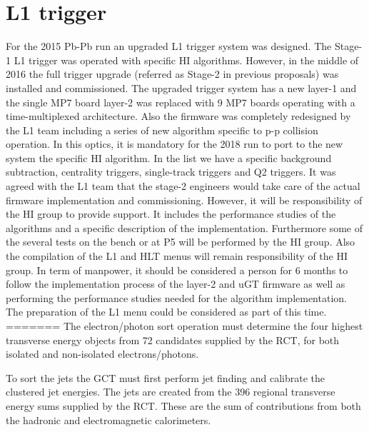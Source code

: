 \section{L1 trigger\label{sec:L1Trigger}}
For the 2015 Pb-Pb run an upgraded L1 trigger system was designed. The Stage-1 L1 trigger was operated with specific HI
algorithms. However, in the middle of 2016 the full trigger upgrade (referred as Stage-2 in previous proposals) was
installed and commissioned. The upgraded trigger system has a new layer-1 and the single MP7 board layer-2 was replaced
with 9 MP7 boards operating with a time-multiplexed architecture. Also the firmware was completely redesigned by the L1
team including a series of new algorithm specific to p-p collision operation. In this optics, it is mandatory for the
2018 run to port to the new system the specific HI algorithm. In the list we have a specific background subtraction,
centrality triggers, single-track triggers and Q2 triggers. It was agreed with the L1 team that the stage-2 engineers
would take care of the actual firmware implementation and commissioning. However, it will be responsibility of the HI
group to provide support. It includes the performance studies of the algorithms and a specific description of the
implementation. Furthermore some of the several tests on the bench or at P5 will be performed by the HI group. Also the
compilation of the L1 and HLT menus will remain responsibility of the HI group. In term of manpower, it should be
considered a person for 6 months to follow the implementation process of the layer-2 and uGT firmware as well as
performing the performance studies needed for the algorithm implementation. The preparation of the L1 menu could be
considered as part of this time. 
=======
The electron/photon sort operation must determine the four highest transverse energy objects from 72 candidates supplied by the RCT, 
for both isolated and non-isolated electrons/photons.

To sort the jets the GCT must first perform jet finding and calibrate the clustered jet energies. The jets are created from the 396 
regional transverse energy sums supplied by the RCT. These are the sum of contributions from both the hadronic and electromagnetic 
calorimeters.

